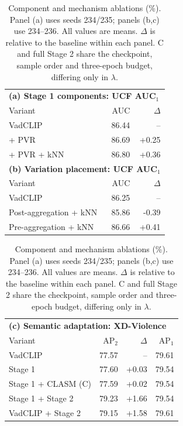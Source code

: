 \begin{table}[t]
\centering
\caption{Component and mechanism ablations (\%). Panel (a) uses seeds 234/235; panels (b,c) use 234--236. All values are means. $\Delta$ is relative to the baseline within each panel. C and full Stage 2 share the checkpoint, sample order and three-epoch budget, differing only in $\lambda$.}
\label{tab:ablations}
\small
\setlength{\tabcolsep}{5pt}
\begin{tabular}{lrr}\toprule
\multicolumn{3}{l}{\textbf{(a) Stage 1 components: UCF AUC$_1$}}\\
Variant & AUC & $\Delta$\\\midrule
VadCLIP & 86.44 & -- \\
+ PVR & 86.69 & +0.25 \\
+ PVR + kNN & 86.80 & +0.36 \\
\midrule
\multicolumn{3}{l}{\textbf{(b) Variation placement: UCF AUC$_1$}}\\
Variant & AUC & $\Delta$\\\midrule
VadCLIP & 86.25 & -- \\
Post-aggregation + kNN & 85.86 & -0.39 \\
Pre-aggregation + kNN & 86.66 & +0.41 \\
\bottomrule\end{tabular}
\par\vspace{6pt}
\setlength{\tabcolsep}{4pt}
\begin{tabular}{lrrr}\toprule
\multicolumn{4}{l}{\textbf{(c) Semantic adaptation: XD-Violence}}\\
Variant & AP$_2$ & $\Delta$ & AP$_1$\\\midrule
VadCLIP & 77.57 & -- & 79.61 \\
Stage 1 & 77.60 & +0.03 & 79.54 \\
Stage 1 + CLASM (C) & 77.59 & +0.02 & 79.54 \\
Stage 1 + Stage 2 & 79.23 & +1.66 & 79.54 \\
VadCLIP + Stage 2 & 79.15 & +1.58 & 79.61 \\
\bottomrule\end{tabular}
\end{table}
